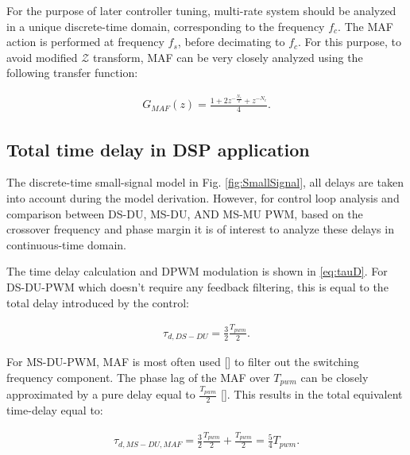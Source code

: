 \documentclass[journal]{IEEEtran}
\begin{document}
For the purpose of later controller tuning, multi-rate system should be analyzed in a unique discrete-time domain, corresponding to the frequency $f_c$. The MAF action is performed at frequency $f_s$, before decimating to $f_c$. For this purpose, to avoid modified $\mathcal{Z}$ transform, MAF can be very closely analyzed using the following transfer function:

\begin{equation}
\begin{aligned}
G_{MAF}(z) = \frac{1 + 2z^{-\frac{N_c}{2}} + z^{-N_c}}{4}.
\label{eq:MAF} 
\end{aligned}    
\end{equation}


\subsection{Total time delay in DSP application}

The discrete-time small-signal model in Fig. \ref{fig:SmallSignal}, all delays are taken into account during the model derivation. 
However, for control loop analysis and comparison between DS-DU, MS-DU, AND MS-MU PWM, based on the crossover frequency and phase margin it is of interest to analyze these delays in continuous-time domain.

The time delay calculation and DPWM modulation is shown in \ref{eq:tauD}. For DS-DU-PWM which doesn't require any feedback filtering, this is equal to the total delay introduced by the control:

\begin{equation}
\begin{aligned}
\tau_{d,DS-DU} = \frac{3}{2} \frac{T_{pwm}}{2}.
\label{eq:tauDSDU} 
\end{aligned}    
\end{equation}

For MS-DU-PWM, MAF is most often used [] to filter out the switching frequency component. The phase lag of the MAF over $T_{pwm}$ can be closely approximated by a pure delay equal to $\frac{T_{pwm}}{2}$ []. This results in the total equivalent time-delay equal to:

\begin{equation}
\begin{aligned}
\tau_{d,MS-DU,MAF} = \frac{3}{2} \frac{T_{pwm}}{2} + \frac{T_{pwm}}{2} = \frac{5}{4} T_{pwm}.
\label{eq:tauMSDU} 
\end{aligned}    
\end{equation}
\end{document}
